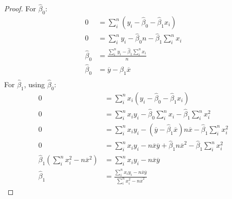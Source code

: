 \documentclass{article}
\begin{document}
\begin{proof}
    For $\hat{\beta}_0$:
    \begin{align*}
        0             & = \sum_i^n \left( y_i - \hat{\beta}_0 - \hat{\beta}_1 x_i \right) \\
        0             & = \sum_i^n y_i - \hat{\beta}_0n - \hat{\beta}_1 \sum_i^n x_i      \\
        \hat{\beta}_0 & = \frac{\sum_i^n y_i - \hat{\beta}_1 \sum_i^n x_i}{n}             \\
        \hat{\beta}_0 & = \overline{y} - \hat{\beta}_1\overline{x}                        \\
    \end{align*}
    For $\hat{\beta}_1$, using $\hat{\beta}_0$:
    \begin{align*}
        0                                                              & = \sum_i^n x_i \left( y_i - \hat{\beta}_0 - \hat{\beta}_1 x_i \right)                                                      \\
        0                                                              & = \sum_i^n x_i y_i - \hat{\beta}_0 \sum_i^n x_i - \hat{\beta}_1 \sum_i^n x_i^2                                             \\
        0                                                              & = \sum_i^n x_i y_i - \left( \overline{y} - \hat{\beta}_1\overline{x} \right) n \overline{x} - \hat{\beta}_1 \sum_i^n x_i^2 \\
        0                                                              & = \sum_i^n x_i y_i - n \overline{x} \overline{y} + \hat{\beta}_1 n \overline{x}^2 - \hat{\beta}_1 \sum_i^n x_i^2           \\
        \hat{\beta}_1 \left( \sum_i^n x_i^2 - n \overline{x}^2 \right) & = \sum_i^n x_i y_i - n \overline{x} \overline{y}                                                                           \\
        \hat{\beta}_1                                                  & = \frac{\sum_i^n x_i y_i - n \overline{x} \overline{y}}{\sum_i^n x_i^2 - n \overline{x}^2}
    \end{align*}
\end{proof}
\end{document}
